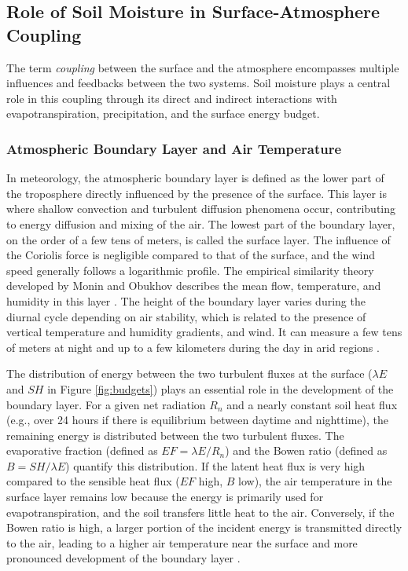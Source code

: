 \subsection{Role of Soil Moisture in Surface-Atmosphere Coupling}

The term \textit{coupling} between the surface and the atmosphere encompasses multiple influences and feedbacks between the two systems. Soil moisture plays a central role in this coupling through its direct and indirect interactions with evapotranspiration, precipitation, and the surface energy budget.

\subsubsection*{Atmospheric Boundary Layer and Air Temperature}

In meteorology, the atmospheric boundary layer is defined as the lower part of the troposphere directly influenced by the presence of the surface. This layer is where shallow convection and turbulent diffusion phenomena occur, contributing to energy diffusion and mixing of the air.
The lowest part of the boundary layer, on the order of a few tens of meters, is called the surface layer. The influence of the Coriolis force is negligible compared to that of the surface, and the wind speed generally follows a logarithmic profile. The empirical similarity theory developed by Monin and Obukhov describes the mean flow, temperature, and humidity in this layer \citep{monin1954osnovnye}.
The height of the boundary layer varies during the diurnal cycle depending on air stability, which is related to the presence of vertical temperature and humidity gradients, and wind. It can measure a few tens of meters at night and up to a few kilometers during the day in arid regions \citep{garratt_review_1994}.

The distribution of energy between the two turbulent fluxes at the surface ($\lambda E$ and $SH$ in Figure \ref{fig:budgets}) plays an essential role in the development of the boundary layer. For a given net radiation $R_n$ and a nearly constant soil heat flux (e.g., over 24 hours if there is equilibrium between daytime and nighttime), the remaining energy is distributed between the two turbulent fluxes. The evaporative fraction (defined as $EF = \lambda E / R_n$) and the Bowen ratio (defined as $B = SH / \lambda E$) quantify this distribution. If the latent heat flux is very high compared to the sensible heat flux ($EF$ high, $B$ low), the air temperature in the surface layer remains low because the energy is primarily used for evapotranspiration, and the soil transfers little heat to the air. Conversely, if the Bowen ratio is high, a larger portion of the incident energy is transmitted directly to the air, leading to a higher air temperature near the surface and more pronounced development of the boundary layer \citep{betts_fife_1995}.

